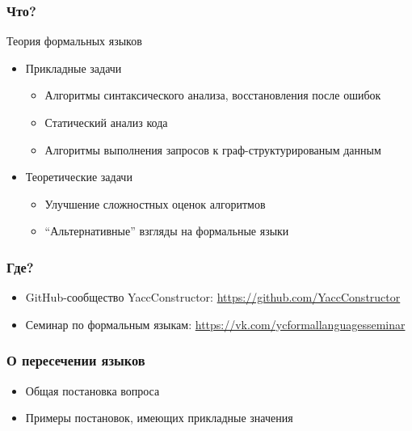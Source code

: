 \documentclass{beamer}
\begin{document}
\begin{frame}[fragile]
  \transwipe[direction=90]
  \frametitle{Что?}
  Теория формальных языков
  \begin{itemize}
    \item Прикладные задачи
    \begin{itemize}
      \item Алгоритмы синтаксического анализа, восстановления после ошибок
      \item Статический анализ кода
      \item Алгоритмы выполнения запросов к граф-структурированым данным
    \end{itemize}
    \item Теоретические задачи
    \begin{itemize}
      \item Улучшение сложностных оценок алгоритмов
      \item ``Альтернативные'' взгляды на формальные языки
    \end{itemize}
  \end{itemize}
\end{frame}

\begin{frame}[fragile]
  \transwipe[direction=90]
  \frametitle{Где?}  
  \begin{itemize}
    \item GitHub-сообщество YaccConstructor: \url{https://github.com/YaccConstructor}
    \item Семинар по формальным языкам: \url{https://vk.com/ycformallanguagesseminar}
  \end{itemize}
\end{frame}


\begin{frame}[fragile]
\transwipe[direction=90]
\frametitle{О пересечении языков}
  \begin{itemize}
    \item Общая постановка вопроса
    \item Примеры постановок, имеющих прикладные значения
  \end{itemize}
  
\end{frame}
\end{document}
